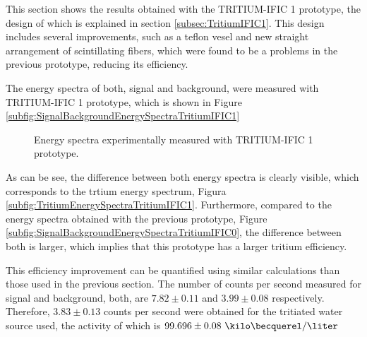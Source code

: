 This section shows the results obtained with the TRITIUM-IFIC 1 prototype, the design of which is explained in section \ref{subsec:TritiumIFIC1}. This design includes several improvements, such as a teflon vesel and new straight arrangement of scintillating fibers, which were found to be a problems in the previous prototype, reducing its efficiency.

The energy spectra of both, signal and background, were measured with TRITIUM-IFIC 1 prototype, which is shown in Figure \ref{subfig:SignalBackgroundEnergySpectraTritiumIFIC1}

\begin{figure}[h]
 \centering
   \newline
 \caption{Energy spectra experimentally measured with TRITIUM-IFIC 1 prototype.}
 \label{fig:EnergySpectraTRITIUMIFIC1}
\end{figure}


As can be see, the difference between both energy spectra is clearly visible, which corresponds to the trtium energy spectrum, Figura \ref{subfig:TritiumEnergySpectraTritiumIFIC1}. Furthermore, compared to the energy spectra obtained with the previous prototype, Figure \ref{subfig:SignalBackgroundEnergySpectraTritiumIFIC0}, the difference between both is larger, which implies that this prototype has a larger tritium efficiency.

This efficiency improvement can be quantified using similar calculations than those used in the previous section. The number of counts per second measured for signal and background, both, are $7.82 \pm 0.11$ and $3.99 \pm 0.08$ respectively. Therefore, $3.83 \pm 0.13$ counts per second were obtained for the tritiated water source used, the activity of which is $99.696 \pm 0.08~\kilo\becquerel/\liter$

